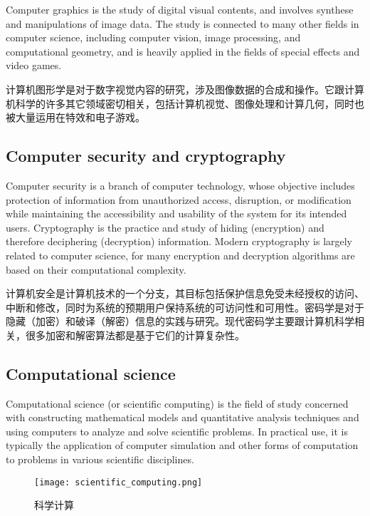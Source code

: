 Computer graphics is the study of digital visual contents, and involves synthese and manipulations of image data. The study is connected to many other fields in computer science, including computer vision, image processing, and computational geometry, and is heavily applied in the fields of special effects and video games.

计算机图形学是对于数字视觉内容的研究，涉及图像数据的合成和操作。它跟计算机科学的许多其它领域密切相关，包括计算机视觉、图像处理和计算几何，同时也被大量运用在特效和电子游戏。






\subsection{Computer security and cryptography}



Computer security is a branch of computer technology, whose objective includes protection of information from unauthorized access, disruption, or modification while maintaining the accessibility and usability of the system for its intended users. Cryptography is the practice and study of hiding (encryption) and therefore deciphering (decryption) information. Modern cryptography is largely related to computer science, for many encryption and decryption algorithms are based on their computational complexity.

计算机安全是计算机技术的一个分支，其目标包括保护信息免受未经授权的访问、中断和修改，同时为系统的预期用户保持系统的可访问性和可用性。密码学是对于隐藏（加密）和破译（解密）信息的实践与研究。现代密码学主要跟计算机科学相关，很多加密和解密算法都是基于它们的计算复杂性。





\subsection{Computational science}


Computational science (or scientific computing) is the field of study concerned with constructing mathematical models and quantitative analysis techniques and using computers to analyze and solve scientific problems. In practical use, it is typically the application of computer simulation and other forms of computation to problems in various scientific disciplines.




\begin{figure}[!h]
\centering
\texttt{[image: scientific\_computing.png]}
\caption{科学计算}
\label{scientific_computing}
\end{figure}


